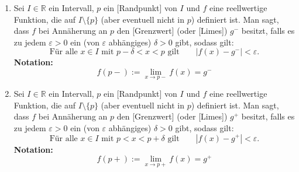 \begin{enumerate}[leftmargin=*]
    \item Sei $I \in \mathbb{R}$ ein Intervall, $p$ ein [Randpunkt] von $I$ und $f$ eine reellwertige Funktion, die auf $I \setminus \{p\}$ (aber eventuell nicht in $p$) definiert ist. Man sagt, dass $f$ bei Annäherung an $p$
    den [Grenzwert] (oder [Limes]) $g^-$ besitzt, falls es zu jedem $\varepsilon > 0$ ein (von $\varepsilon$ abhängiges) $\delta > 0$ gibt, sodass gilt:
    $$\text{Für alle $x \in I$ mit $p - \delta < x < p$ gilt} \qquad | f (x) - g^- | < \varepsilon.$$
    \textbf{Notation:}
    $$f(p-) := \lim_{x \to p-} f(x) = g^-$$
    \item Sei $I \in \mathbb{R}$ ein Intervall, $p$ ein [Randpunkt] von $I$ und $f$ eine reellwertige Funktion, die auf $I \setminus \{p\}$ (aber eventuell nicht in $p$) definiert ist. Man sagt, dass $f$ bei Annäherung an $p$
    den [Grenzwert] (oder [Limes]) $g^+$ besitzt, falls es zu jedem $\varepsilon > 0$ ein (von $\varepsilon$ abhängiges) $\delta > 0$ gibt, sodass gilt:
    $$\text{Für alle $x \in I$ mit $p < x < p + \delta$ gilt} \qquad | f (x) - g^+ | < \varepsilon.$$
    \textbf{Notation:}
    $$f(p+) := \lim_{x \to p+} f(x) = g^+$$ 
\end{enumerate}